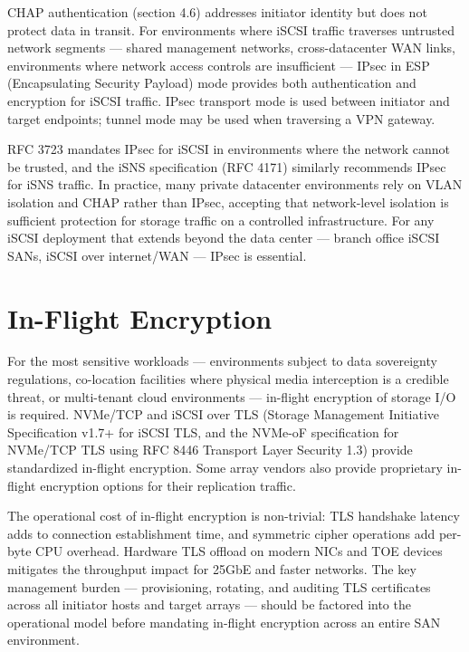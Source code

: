 CHAP authentication (section 4.6) addresses initiator identity but does not protect data in transit. For environments where iSCSI traffic traverses untrusted network segments --- shared management networks, cross-datacenter WAN links, environments where network access controls are insufficient --- IPsec in ESP (Encapsulating Security Payload) mode provides both authentication and encryption for iSCSI traffic. IPsec transport mode is used between initiator and target endpoints; tunnel mode may be used when traversing a VPN gateway.

RFC 3723 mandates IPsec for iSCSI in environments where the network cannot be trusted, and the iSNS specification (RFC 4171) similarly recommends IPsec for iSNS traffic. In practice, many private datacenter environments rely on VLAN isolation and CHAP rather than IPsec, accepting that network-level isolation is sufficient protection for storage traffic on a controlled infrastructure. For any iSCSI deployment that extends beyond the data center --- branch office iSCSI SANs, iSCSI over internet/WAN --- IPsec is essential.

\section{In-Flight Encryption}
For the most sensitive workloads --- environments subject to data sovereignty regulations, co-location facilities where physical media interception is a credible threat, or multi-tenant cloud environments --- in-flight encryption of storage I/O is required. NVMe/TCP and iSCSI over TLS (Storage Management Initiative Specification v1.7+ for iSCSI TLS, and the NVMe-oF specification for NVMe/TCP TLS using RFC 8446 Transport Layer Security 1.3) provide standardized in-flight encryption. Some array vendors also provide proprietary in-flight encryption options for their replication traffic.

The operational cost of in-flight encryption is non-trivial: TLS handshake latency adds to connection establishment time, and symmetric cipher operations add per-byte CPU overhead. Hardware TLS offload on modern NICs and TOE devices mitigates the throughput impact for 25GbE and faster networks. The key management burden --- provisioning, rotating, and auditing TLS certificates across all initiator hosts and target arrays --- should be factored into the operational model before mandating in-flight encryption across an entire SAN environment.

